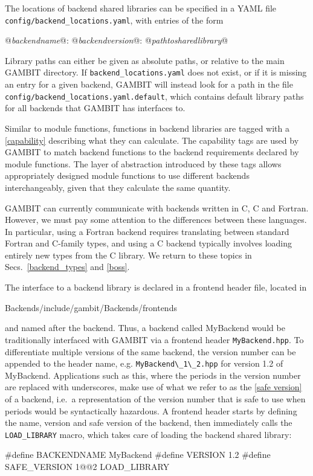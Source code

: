 \documentclass[pdftex,twocolumn,epjc3_preprint,runningheads]{svjour3}
\renewcommand{\_}{\discretionary{\underscore}{}{\underscore}}
\newcommand\term[1]{{\lstset{style=terminal}\lstinline!#1!\lstset{style=cpp}}}
\newcommand{\cross}[1]{\ref{#1}}
\newcommand{\metavarf}[1]{\textit{\color{darkgreen}\footnotesize\textrm{#1}}}
\newcommand{\metavar}{\metavarf}
\newcommand{\gambit}{\textsf{GAMBIT}\xspace}
\newcommand{\GB}{\gambit}
\newcommand\xx{\raisebox{0.2ex}{\smaller ++}\xspace}
\newcommand\Cpp{\textsf{C\xx}\xspace}
\newcommand\plainC{\textsf{C}\xspace}
\newcommand\Fortran{\textsf{Fortran}\xspace}
\newcommand\YAML{\textsf{YAML}\xspace}
\begin{document}
The locations of backend shared libraries can be specified in a \YAML file \term{config/backend_locations.yaml}, with entries of the form
\begin{lstyaml}
@\metavar{backend\_name}@:
  @\metavar{backend\_version}@:  @\metavar{path\_to\_shared\_library}@
\end{lstyaml}
Library paths can either be given as absolute paths, or relative to the main \GB directory. If \term{backend_}\term{locations.yaml} does not exist, or if it is missing an entry for a given backend, \GB will instead look for a path in the file \term{config/backend_locations.yaml.default}, which contains default library paths for all backends that \GB has interfaces to.

Similar to module functions, functions in backend libraries are tagged with a \cross{capability} describing what they can calculate. The capability tags are used by \GB to match backend functions to the backend requirements declared by module functions. The layer of abstraction introduced by these tags allows appropriately designed module functions to use different backends interchangeably, given that they calculate the same quantity.

\GB can currently communicate with backends written in \plainC, \Cpp and \Fortran. However, we must pay some attention to the differences between these languages. In particular, using a \Fortran backend requires translating between standard \Fortran and \plainC-family types, and using a \Cpp backend typically involves loading entirely new types from the \Cpp library. We return to these topics in Secs.\ \ref{backend_types} and \ref{boss}.

The interface to a backend library is declared in a frontend header file, located in
\begin{lstterm}
Backends/include/gambit/Backends/frontends
\end{lstterm}
and named after the backend. Thus, a backend called \textsf{MyBackend} would be traditionally interfaced with \GB via a frontend header \term{MyBackend.hpp}. To differentiate multiple versions of the same backend, the version number can be appended to the header name, e.g. \term{MyBackend\_1\_2.hpp} for version 1.2 of \textsf{MyBackend}. Applications such as this, where the periods in the version number are replaced with underscores, make use of what we refer to as the \cross{safe version} of a backend, i.e.\ a representation of the version number that is safe to use when periods would be syntactically hazardous. A frontend header starts by defining the name, version and safe version of the backend, then immediately calls the \lstinline|LOAD_LIBRARY| macro, which takes care of loading the backend shared library:
\begin{lstcpp}
#define BACKENDNAME MyBackend
#define VERSION 1.2
#define SAFE_VERSION 1@\_@2
LOAD_LIBRARY
\end{lstcpp}
\end{document}
